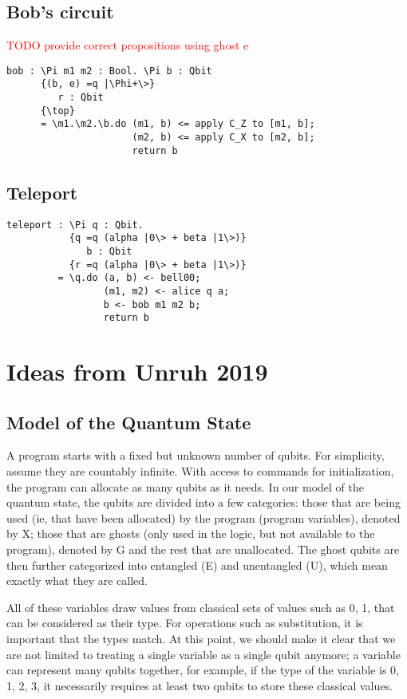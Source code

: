 \documentclass[acmsmall,nonacm,timestamp,review=false,anonymous=false]{acmart}
\newcommand{\todo}[1]{\textcolor{red}{#1}}
\begin{document}
\subsection{Bob's circuit}
\todo{TODO provide correct propositions using ghost e}
\begin{lstlisting}[language=QHaskell]
bob : \Pi m1 m2 : Bool. \Pi b : Qbit
      {(b, e) =q |\Phi+\>}
         r : Qbit
      {\top}
      = \m1.\m2.\b.do (m1, b) <= apply C_Z to [m1, b];
                      (m2, b) <= apply C_X to [m2, b];
                      return b
\end{lstlisting}

\subsection{Teleport}
\begin{lstlisting}[language=QHaskell]
teleport : \Pi q : Qbit.
           {q =q (alpha |0\> + beta |1\>)}
              b : Qbit
           {r =q (alpha |0\> + beta |1\>)}
         = \q.do (a, b) <- bell00;
                 (m1, m2) <- alice q a;
                 b <- bob m1 m2 b;
                 return b
\end{lstlisting}

\section{Ideas from Unruh 2019}
\subsection{Model of the Quantum State}
A program starts with a fixed but unknown number of qubits. For simplicity, assume they are countably infinite.
With access to commands for initialization, the program can allocate as many qubits as it needs.
In our model of the quantum state, the qubits are divided into a few categories: those that are being used (ie, that have been allocated) by the program (program variables), denoted by X; those that are ghosts (only used in the logic, but not available to the program), denoted by G and the rest that are unallocated. The ghost qubits are then further categorized into entangled (E) and unentangled (U), which mean exactly what they are called.

All of these variables draw values from classical sets of values such as {0, 1}, that can be considered as their type. For operations such as substitution, it is important that the types match. At this point, we should make it clear that we are not limited to treating a single variable as a single qubit anymore; a variable can represent many qubits together, for example, if the type of the variable is {0, 1, 2, 3}, it necessarily requires at least two qubits to store these classical values.
\end{document}
